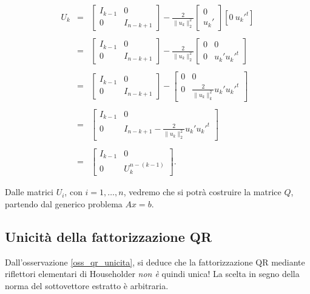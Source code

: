 \[
\begin{array}{lcl}
U_k & = &
 \left[
 \begin{array}{c|c}
 I_{k-1} & 0 \\
 \hline
 0 & I_{n-k+1}
 \end{array}
 \right] - \frac{2}{\|u_k\|_2^2}\left[\begin{array}{c}0 \\ u_k'\end{array}
 \right]\left[0\ u_k'^t\right]\\
\\
& = & \left[
 \begin{array}{c|c}
 I_{k-1} & 0 \\
 \hline
 0 & I_{n-k+1}
 \end{array}
 \right] - \frac{2}{\|u_k\|_2^2}\left[
 \begin{array}{c|c}
 0 & 0 \\
 \hline
 0 & u_k'u_k'^t
 \end{array}
 \right] \\
\\
& = & \left[
 \begin{array}{c|c}
 I_{k-1} & 0 \\
 \hline
 0 & I_{n-k+1}
 \end{array}
 \right] - \left[
 \begin{array}{c|c}
 0 & 0\\
 \hline
 0 & \frac{2}{\|u_k\|_k^2}u_k'u_k'^t
 \end{array}
 \right] \\
\\
& = & \left[
 \begin{array}{c|c}
 I_{k-1} & 0 \\
 \hline
 0 & I_{n-k+1} - \frac{2}{\|u_k\|_2^2}u_k'u_k'^t
 \end{array}
 \right]\\
\\
& = & \left[
 \begin{array}{c|c}
 I_{k-1} & 0 \\
 \hline
 0 & U_k^{n-(k-1)}
 \end{array}
 \right].
\end{array}
\]

Dalle matrici $U_i$, con $i = 1, \ldots, n$, vedremo che si potrà costruire
la matrice $Q$, partendo dal generico problema $Ax = b$.

\subsection{Unicità della fattorizzazione QR}
Dall'osservazione \ref{oss_qr_unicita}, si deduce che la fattorizzazione QR
mediante riflettori elementari di Householder \emph{non è} quindi unica!
La scelta in segno della norma del sottovettore estratto è arbitraria.

